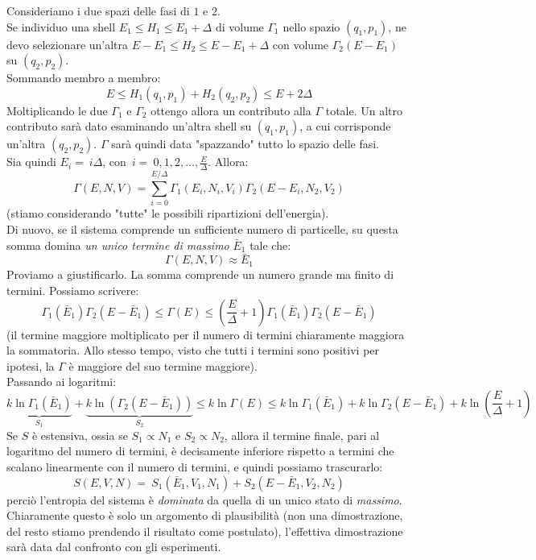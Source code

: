 \documentclass[../MeccanicaStatistica.tex]{subfiles}
\begin{document}
Consideriamo i due spazi delle fasi di $1$ e $2$.\\
Se individuo una shell $E_1\leq H_1 \leq E_1+\Delta$ di volume $\Gamma_1$ nello spazio $(q_1, p_1)$, ne devo selezionare un'altra $E-E_1 \leq H_2 \leq E-E_1 +\Delta$ con volume $\Gamma_2(E-E_1)$ su $(q_2, p_2)$.\\
Sommando membro a membro:
\[
E \leq H_1(q_1, p_1) + H_2(q_2, p_2) \leq E+2\Delta
\]
Moltiplicando le due $\Gamma_1$ e $\Gamma_2$ ottengo allora un contributo alla $\Gamma$ totale. Un altro contributo sarà dato esaminando un'altra shell su $(q_1, p_1)$, a cui corrisponde un'altra $(q_2, p_2)$. $\Gamma$ sarà quindi data "spazzando" tutto lo spazio delle fasi.\\
Sia quindi $E_i =\ i\Delta$, con\ $i =\ 0,1,2,\dots, \frac{E}{\Delta}$. Allora:
\[
\Gamma(E,N,V) =\sum_{i=0}^{E/\Delta} \Gamma_1(E_i, N_i,V_i) \Gamma_2(E-E_i, N_2, V_2)
\]
(stiamo considerando "tutte" le possibili ripartizioni dell'energia).\\
Di nuovo, se il sistema comprende un sufficiente numero di particelle, su questa somma domina \textit{un unico termine di massimo} $\bar{E}_1$ tale che:
\[
\Gamma(E,N,V) \approx \bar{E}_1
\]
Proviamo a giustificarlo. La somma comprende un numero grande ma finito di termini. Possiamo scrivere:
\[
\Gamma_1(\bar{E}_1)\Gamma_2(E-\bar{E}_1) \leq \Gamma(E) \leq \left (\frac{E}{\Delta}+1\right ) \Gamma_1(\bar{E}_1)\Gamma_2(E-\bar{E}_1)
\]
(il termine maggiore moltiplicato per il numero di termini chiaramente maggiora la sommatoria. Allo stesso tempo, visto che tutti i termini sono positivi per ipotesi, la $\Gamma$ è maggiore del suo termine maggiore).\\
Passando ai logaritmi:
\[
\underbrace{k\ln \Gamma_1(\bar{E}_1)}_{S_1} + \underbrace{k\ln(\Gamma_2(E-\bar{E}_1))}_{S_2} \leq k\ln\Gamma(E) \leq k\ln\Gamma_1(\bar{E}_1) + k\ln\Gamma_2(E-\bar{E}_1) + k\ln \left (\frac{E}{\Delta} +1 \right )
\]
Se $S$ è estensiva, ossia se $S_1 \propto N_1$ e $S_2 \propto N_2$, allora il termine finale, pari al logaritmo del numero di termini, è decisamente inferiore rispetto a termini che scalano linearmente con il numero di termini, e quindi possiamo trascurarlo:
\[
S(E,V,N) =\ S_1(\bar{E}_1,V_1,N_1) + S_2(E-\bar{E}_1, V_2, N_2)
\]
perciò l'entropia del sistema è \textit{dominata} da quella di un unico stato di \textit{massimo}.\\
Chiaramente questo è solo un argomento di plausibilità (non una dimostrazione, del resto stiamo prendendo il risultato come postulato), l'effettiva dimostrazione sarà data dal confronto con gli esperimenti.

\end{document}
